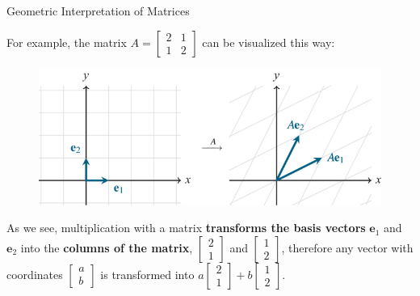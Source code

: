 \documentclass{beamer}
\newcommand{\ve}{\mathbf{e}}
\begin{document}
\begin{frame}{Geometric Interpretation of Matrices}

For example, the matrix $A = \begin{bmatrix}
    2&1\\1&2
\end{bmatrix}$ can be visualized this way:

\begin{figure}
    \centering
    \includegraphics[width=0.75\linewidth]{viz Av.png}
    
    
\end{figure}

As we see, multiplication with a matrix \textbf{transforms the basis vectors} $\ve_1$ and $\ve_2$ into the \textbf{columns of the matrix}, $\begin{bmatrix}
    2\\1
\end{bmatrix}$ and $\begin{bmatrix}
    1\\2
\end{bmatrix}$, therefore any vector with coordinates $\begin{bmatrix}
    a\\b
\end{bmatrix}$ is transformed into $a\begin{bmatrix}
    2\\1
\end{bmatrix}+b\begin{bmatrix}
    1\\2
\end{bmatrix}$.
\end{frame}
\end{document}
